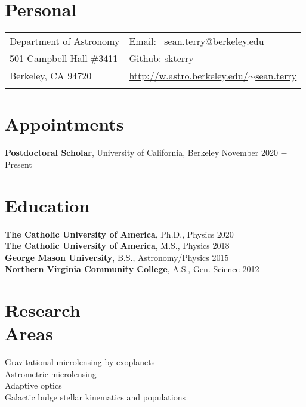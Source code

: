 \documentclass[margin,line]{cv}
\begin{document}

\begin{resume}
\section{\sc Personal}

\vspace{.05in}
\begin{tabular}{@{}p{3.5in}p{3in}}
Department of Astronomy      & Email: \,\,\,sean.terry@berkeley.edu \\
501 Campbell Hall \#3411       &  Github: \hyperlink{https://github.com/skterry}{skterry} \\
Berkeley, CA 94720       & \hyperlink{http://w.astro.berkeley.edu/~sean.terry}{http://w.astro.berkeley.edu/$\sim$sean.terry}\\
 \\
\end{tabular}

\section{\sc Appointments}
{\bf Postdoctoral Scholar}, University of California, Berkeley  \hfill      {November 2020 $-$ Present}\\


\section{\sc Education}
{\bf The Catholic University of America}, Ph.D., Physics  \hfill 2020\\
{\bf The Catholic University of America}, M.S., Physics  \hfill 2018\\
{\bf George Mason University}, B.S., Astronomy/Physics \hfill 2015\\
{\bf Northern Virginia Community College}, A.S., Gen. Science \hfill 2012\\

\section{\sc Research\\ Areas}
Gravitational microlensing by exoplanets  \\
Astrometric microlensing \\
Adaptive optics \\
Galactic bulge stellar kinematics and populations  \\



\end{resume}
\end{document}
